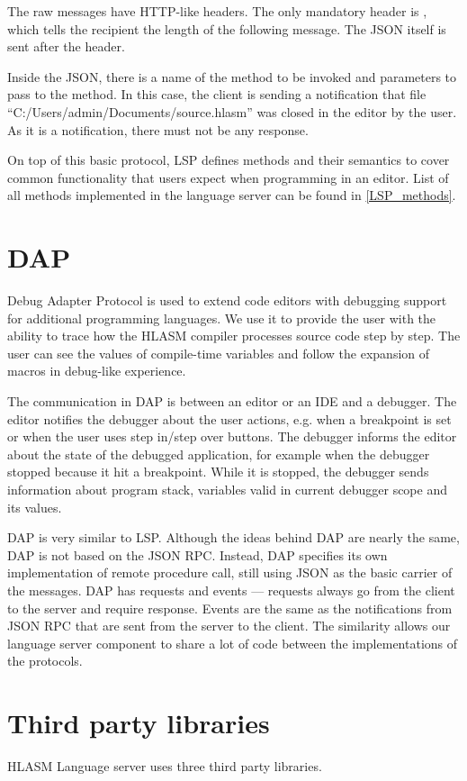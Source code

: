 The raw messages have HTTP-like headers. The only mandatory header is , which tells the recipient the length of the following message. The JSON itself is sent after the header.

Inside the JSON, there is a name of the method to be invoked and parameters to pass to the method. In this case, the client is sending a notification that file ``C:/Users/admin/Documents/source.hlasm'' was closed in the editor by the user. As it is a notification, there must not be any response.

On top of this basic protocol, LSP defines methods and their semantics to cover common functionality that users expect when programming in an editor. List of all methods implemented in the language server can be found in \cref{LSP_methods}.

\section{DAP}
Debug Adapter Protocol is used to extend code editors with debugging support for additional programming languages. We use it to provide the user with the ability to trace how the HLASM compiler processes source code step by step. The user can see the values of compile-time variables and follow the expansion of macros in debug-like experience.

The communication in DAP is between an editor or an IDE and a debugger. The editor notifies the debugger about the user actions, e.g. when a breakpoint is set or when the user uses step in/step over buttons. The debugger informs the editor about the state of the debugged application, for example when the debugger stopped because it hit a breakpoint. While it is stopped, the debugger sends information about program stack, variables valid in current debugger scope and its values.

DAP is very similar to LSP. Although the ideas behind DAP are nearly the same, DAP is not based on the JSON RPC. Instead, DAP specifies its own implementation of remote procedure call, still using JSON as the basic carrier of the messages. DAP has requests and events --- requests always go from the client to the server and require response. Events are the same as the notifications from JSON RPC that are sent from the server to the client. The similarity allows our language server component to share a lot of code between the implementations of the protocols.

\section{Third party libraries}
HLASM Language server uses three third party libraries.

